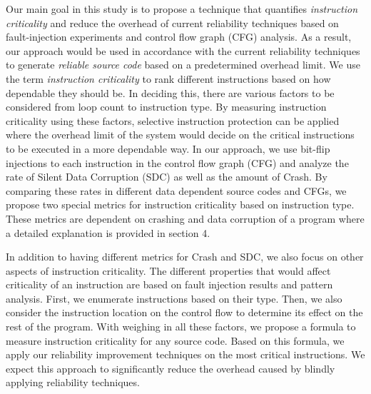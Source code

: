 Our main goal in this study is to propose a technique that quantifies \emph{instruction criticality} and reduce the overhead of current reliability techniques based on fault-injection experiments and control flow graph (CFG) analysis. As a result, our approach would be used in accordance with the current reliability techniques to generate \emph{reliable source code} based on a predetermined overhead limit. We use the term \emph{instruction criticality} to rank different instructions based on how dependable they should be. In deciding this, there are various factors to be considered from loop count to instruction type. By measuring instruction criticality using these factors,  selective instruction protection can be applied where the overhead limit of the system would decide on the critical instructions to be executed in a more dependable way. In our approach, we use bit-flip injections to each instruction in the control flow graph (CFG) and analyze the rate of Silent Data Corruption (SDC) as well as the amount of Crash. By comparing these rates in different data dependent source codes and CFGs, we propose two special metrics for instruction criticality based on instruction type. These metrics are dependent on crashing and data corruption of a program where a detailed explanation is provided in section 4. 

In addition to having different metrics for Crash and SDC, we also focus on other aspects of instruction criticality. The different properties that would affect criticality of an instruction are based on fault injection results and pattern analysis. First, we enumerate instructions based on their type. Then, we also consider the instruction location on the control flow to determine its effect on the rest of the program. With weighing in all these factors, we propose a formula to measure instruction criticality for any source code. Based on this formula, we apply our reliability improvement techniques on the most critical instructions. We expect this approach to significantly reduce the overhead caused by blindly applying reliability techniques. 

